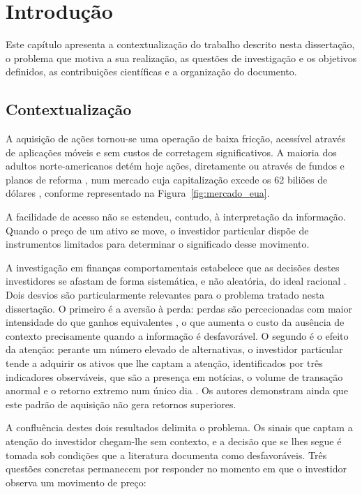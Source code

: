 \chapter{Introdução}
\label{cap:introducao}

Este capítulo apresenta a contextualização do trabalho descrito nesta dissertação, o problema
que motiva a sua realização, as questões de investigação e os objetivos definidos, as
contribuições científicas e a organização do documento.

\section{Contextualização}
\label{sec:intro_origem}

A aquisição de ações tornou-se uma operação de baixa fricção, acessível através de aplicações
móveis e sem custos de corretagem significativos. A maioria dos adultos norte-americanos detém
hoje ações, diretamente ou através de fundos e planos de reforma \autocite{gallup2025stock}, num
mercado cuja capitalização excede os 62 biliões de dólares \autocite{sifma2025factbook}, conforme
representado na Figura~\ref{fig:mercado_eua}.

A facilidade de acesso não se estendeu, contudo, à interpretação da informação. Quando o preço de
um ativo se move, o investidor particular dispõe de instrumentos limitados para determinar o
significado desse movimento.

A investigação em finanças comportamentais estabelece que as decisões destes investidores se
afastam de forma sistemática, e não aleatória, do ideal racional \autocite{barberis2003behavioral}.
Dois desvios são particularmente relevantes para o problema tratado nesta dissertação. O primeiro
é a aversão à perda: perdas são percecionadas com maior intensidade do que ganhos equivalentes
\autocite{kahneman1979prospect}, o que aumenta o custo da ausência de contexto precisamente quando
a informação é desfavorável. O segundo é o efeito da atenção: perante um número elevado de
alternativas, o investidor particular tende a adquirir os ativos que lhe captam a atenção,
identificados por três indicadores observáveis, que são a presença em notícias, o volume de
transação anormal e o retorno extremo num único dia \autocite{barber2008glitters}. Os autores
demonstram ainda que este padrão de aquisição não gera retornos superiores.

A confluência destes dois resultados delimita o problema. Os sinais que captam a atenção do
investidor chegam-lhe sem contexto, e a decisão que se lhes segue é tomada sob condições que a
literatura documenta como desfavoráveis. Três questões concretas permanecem por responder no
momento em que o investidor observa um movimento de preço:

